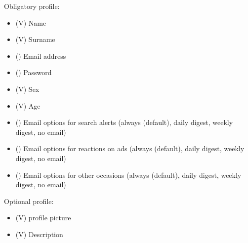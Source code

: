 \documentclass[a4wide]{article}
\begin{document}
Obligatory profile:
\begin{itemize}
\item (V) Name
\item (V) Surname
\item () Email address
\item () Password
\item (V) Sex
\item (V) Age
\item () Email options for search alerts (always (default), daily digest, weekly digest, no email)
\item () Email options for reactions on ads (always (default), daily digest, weekly digest, no email)
\item () Email options for other occasions (always (default), daily digest, weekly digest,  no email)
\end{itemize}
Optional profile:
\begin{itemize}
\item (V) profile picture
\item (V) Description
\end{itemize}
\end{document}
